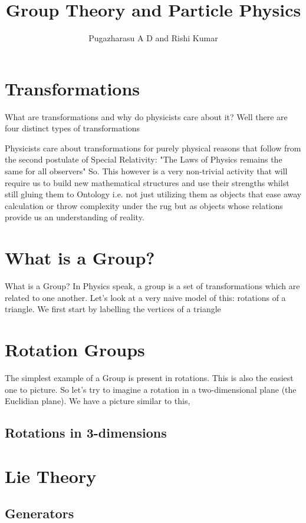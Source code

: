 \documentclass[]{article}
\title{Group Theory and Particle Physics}
\author{Pugazharasu A D and Rishi Kumar}
\begin{document}
\maketitle

\begin{abstract}

\end{abstract}
\section{Transformations}
What are transformations and why do physicists care about it? Well there are four distinct types of transformations

Physicists care about transformations for purely physical reasons that follow from the second postulate of Special Relativity:
"The Laws of Physics remains the same for all observers"
So. This however is a very non-trivial activity that will require us to build new mathematical structures and use their strengths whilst still gluing them to Ontology i.e. not just utilizing them as objects that ease away calculation or throw complexity under the rug but as objects whose relations provide us an understanding of reality.


\section{What is a Group?}
What is a Group? In Physics speak, a group is a set of transformations which are related to one another. Let's look at a very naive model of this: rotations of a triangle. We first start by labelling the vertices of a triangle

\section{Rotation Groups}
The simplest example of a Group is present in rotations. This is also the easiest one to picture. So let's try to imagine a rotation in a two-dimensional plane (the Euclidian plane). We have a picture similar to this,
\subsection{Rotations in 3-dimensions}

\section{Lie Theory}
\subsection{Generators}
\end{document}
